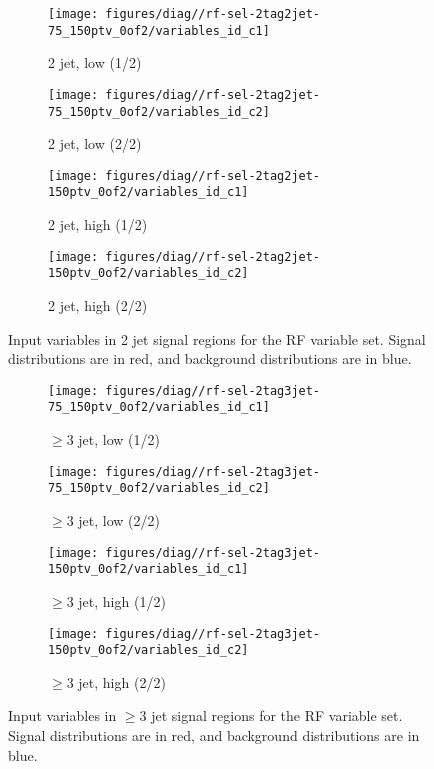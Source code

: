 \begin{figure}[!htbp]\captionsetup{justification=centering}
  \centering
\begin{subfigure}[t]{0.49\textwidth}\centering\texttt{[image: figures/diag//rf-sel-2tag2jet-75\_150ptv\_0of2/variables\_id\_c1]}\caption{2 jet, low \ptv (1/2)}\end{subfigure}
\begin{subfigure}[t]{0.49\textwidth}\centering\texttt{[image: figures/diag//rf-sel-2tag2jet-75\_150ptv\_0of2/variables\_id\_c2]}\caption{2 jet, low \ptv (2/2)}\end{subfigure}
\begin{subfigure}[t]{0.49\textwidth}\centering\texttt{[image: figures/diag//rf-sel-2tag2jet-150ptv\_0of2/variables\_id\_c1]}\caption{2 jet, high \ptv (1/2)}\end{subfigure}
\begin{subfigure}[t]{0.49\textwidth}\centering\texttt{[image: figures/diag//rf-sel-2tag2jet-150ptv\_0of2/variables\_id\_c2]}\caption{2 jet, high \ptv (2/2)}\end{subfigure}
  \caption{Input variables in 2 jet signal regions for the RF variable set.  Signal distributions are in red, and background distributions are in blue.}
  \label{fig:rf-sel-inputs2}
\end{figure}
\begin{figure}[!htbp]\captionsetup{justification=centering}
  \centering
\begin{subfigure}[t]{0.49\textwidth}\centering\texttt{[image: figures/diag//rf-sel-2tag3jet-75\_150ptv\_0of2/variables\_id\_c1]}\caption{$\ge3$ jet, low \ptv (1/2)}\end{subfigure}
\begin{subfigure}[t]{0.49\textwidth}\centering\texttt{[image: figures/diag//rf-sel-2tag3jet-75\_150ptv\_0of2/variables\_id\_c2]}\caption{$\ge3$ jet, low \ptv (2/2)}\end{subfigure}
\begin{subfigure}[t]{0.49\textwidth}\centering\texttt{[image: figures/diag//rf-sel-2tag3jet-150ptv\_0of2/variables\_id\_c1]}\caption{$\ge3$ jet, high \ptv (1/2)}\end{subfigure}
\begin{subfigure}[t]{0.49\textwidth}\centering\texttt{[image: figures/diag//rf-sel-2tag3jet-150ptv\_0of2/variables\_id\_c2]}\caption{$\ge3$ jet, high \ptv (2/2)}\end{subfigure}
  \caption{Input variables in $\ge3$ jet signal regions for the RF variable set.  Signal distributions are in red, and background distributions are in blue.}
  \label{fig:rf-sel-inputs3}
\end{figure}

